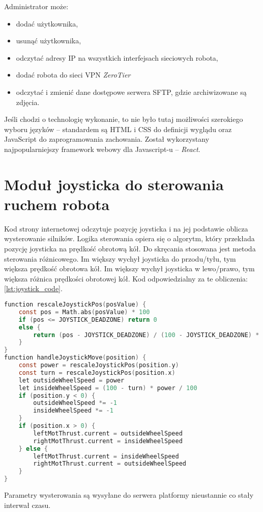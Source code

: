 Administrator może:
\begin{itemize}
    \item dodać użytkownika,
    \item usunąć użytkownika,
    \item odczytać adresy IP na wszystkich interfejsach sieciowych robota,
    \item dodać robota do sieci VPN \textit{ZeroTier}
    \item odczytać i zmienić dane dostępowe serwera SFTP, gdzie archiwizowane są zdjęcia.
\end{itemize}

Jeśli chodzi o technologię wykonanie, to nie było tutaj możliwości szerokiego wyboru języków -- standardem są HTML i CSS do definicji wyglądu oraz JavaScript do zaprogramowania zachowania.
Został wykorzystany najpopularniejszy framework webowy dla Javascript-u -- \textit{React}.

\section{Moduł joysticka do sterowania ruchem robota}
Kod strony internetowej odczytuje pozycję joysticka i na jej podstawie oblicza wysterowanie silników.
Logika sterowania opiera się o algorytm, który przekłada pozycję joysticka na prędkość obrotową kół.
Do skręcania stosowana jest metoda sterowania różnicowego.
Im większy wychył joysticka do przodu/tyłu, tym większa prędkość obrotowa kół.
Im większy wychył joysticka w lewo/prawo, tym większa różnica prędkości obrotowej kół.
Kod odpowiedzialny za te obliczenia: \ref{lst:joystick_code}.
\begin{lstlisting}[language=C,
    caption={Kod obliczający moc silników na podstawie wychylenia joysticka},
    label={lst:joystick_code}]
function rescaleJoystickPos(posValue) {
    const pos = Math.abs(posValue) * 100
    if (pos <= JOYSTICK_DEADZONE) return 0
    else {
        return (pos - JOYSTICK_DEADZONE) / (100 - JOYSTICK_DEADZONE) * 100
    }
}
function handleJoystickMove(position) {
    const power = rescaleJoystickPos(position.y)
    const turn = rescaleJoystickPos(position.x)
    let outsideWheelSpeed = power
    let insideWheelSpeed = (100 - turn) * power / 100
    if (position.y < 0) {
        outsideWheelSpeed *= -1
        insideWheelSpeed *= -1
    }
    if (position.x > 0) {
        leftMotThrust.current = outsideWheelSpeed
        rightMotThrust.current = insideWheelSpeed
    } else {
        leftMotThrust.current = insideWheelSpeed
        rightMotThrust.current = outsideWheelSpeed
    }
}
\end{lstlisting}
Parametry wysterowania są wysyłane do serwera platformy nieustannie co stały interwał czasu.
